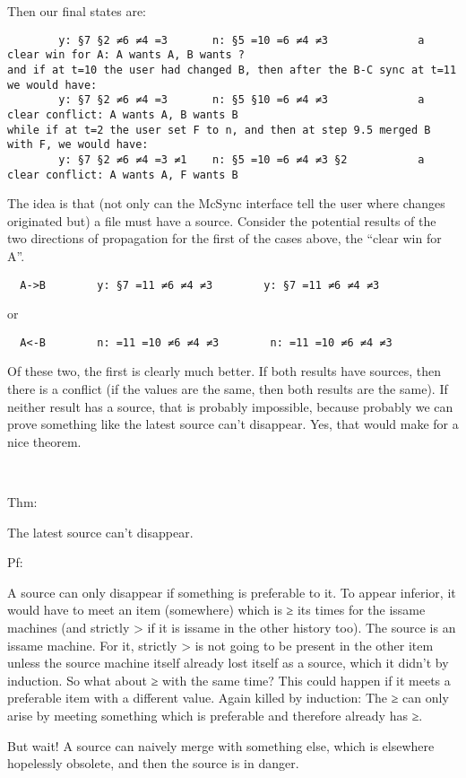 \documentclass{book}
\begin{document}
Then our final states are:
\begin{verbatim}
        y: §7 §2 ≠6 ≠4 =3       n: §5 =10 =6 ≠4 ≠3              a clear win for A: A wants A, B wants ?
and if at t=10 the user had changed B, then after the B-C sync at t=11 we would have:
        y: §7 §2 ≠6 ≠4 =3       n: §5 §10 =6 ≠4 ≠3              a clear conflict: A wants A, B wants B
while if at t=2 the user set F to n, and then at step 9.5 merged B with F, we would have:
        y: §7 §2 ≠6 ≠4 =3 ≠1    n: §5 =10 =6 ≠4 ≠3 §2           a clear conflict: A wants A, F wants B
\end{verbatim}
The idea is that (not only can the McSync interface tell the user where changes originated but) a file must have a source.  Consider the potential results of the two directions of propagation for the first of the cases above, the ``clear win for A''.
\begin{verbatim}
  A->B        y: §7 =11 ≠6 ≠4 ≠3        y: §7 =11 ≠6 ≠4 ≠3
\end{verbatim}
or
\begin{verbatim}
  A<-B        n: =11 =10 ≠6 ≠4 ≠3        n: =11 =10 ≠6 ≠4 ≠3
\end{verbatim}
Of these two, the first is clearly much better.  If both results have sources, then there is a conflict (if the values are the same, then both results are the same).  If neither result has a source, that is probably impossible, because probably we can prove something like the latest source can't disappear.  Yes, that would make for a nice theorem.

~

Thm:

The latest source can't disappear.

Pf:

A source can only disappear if something is preferable to it.  To appear inferior, it would have to meet an item (somewhere) which is ≥ its times for the issame machines (and strictly > if it is issame in the other history too).  The source is an issame machine.  For it, strictly > is not going to be present in the other item unless the source machine itself already lost itself as a source, which it didn't by induction.  So what about ≥ with the same time?  This could happen if it meets a preferable item with a different value.  Again killed by induction: The ≥ can only arise by meeting something which is preferable and therefore already has ≥.

But wait!  A source can naively merge with something else, which is elsewhere hopelessly obsolete, and then the source is in danger.
\end{document}
